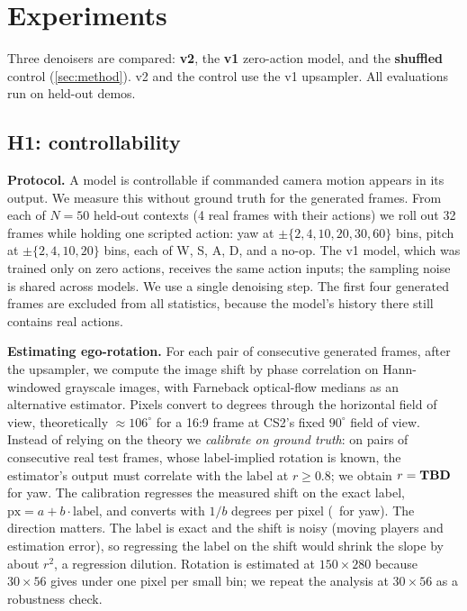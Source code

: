 \section{Experiments}
\label{sec:experiments}
Three denoisers are compared: \textbf{v2}, the \textbf{v1} zero-action model, and the \textbf{shuffled} control (\cref{sec:method}).
v2 and the control use the v1 upsampler.
All evaluations run on held-out demos.

\subsection{H1: controllability}
\label{sec:h1}
\textbf{Protocol.}
A model is controllable if commanded camera motion appears in its output.
We measure this without ground truth for the generated frames.
From each of $N=50$ held-out contexts (4 real frames with their actions) we roll out 32 frames while holding one scripted action:
yaw at $\pm\{2,4,10,20,30,60\}$ bins, pitch at $\pm\{2,4,10,20\}$ bins, each of W, S, A, D, and a no-op.
The v1 model, which was trained only on zero actions, receives the same action inputs; the sampling noise is shared across models.
We use a single denoising step.
The first four generated frames are excluded from all statistics, because the model's history there still contains real actions.

\textbf{Estimating ego-rotation.}
For each pair of consecutive generated frames, after the upsampler, we compute the image shift by phase correlation on Hann-windowed grayscale images, with Farneback optical-flow medians as an alternative estimator.
Pixels convert to degrees through the horizontal field of view, theoretically $\approx106^\circ$ for a 16:9 frame at CS2's fixed $90^\circ$ field of view.
Instead of relying on the theory we \emph{calibrate on ground truth}: on pairs of consecutive real test frames, whose label-implied rotation is known, the estimator's output must correlate with the label at $r\ge0.8$; we obtain $r=\textbf{TBD}$ for yaw.
The calibration regresses the measured shift on the exact label, $\mathrm{px}=a+b\cdot\mathrm{label}$, and converts with $1/b$ degrees per pixel (\TBDdegperpx\ for yaw).
The direction matters.
The label is exact and the shift is noisy (moving players and estimation error), so regressing the label on the shift would shrink the slope by about $r^2$, a regression dilution.
Rotation is estimated at $150{\times}280$ because $30{\times}56$ gives under one pixel per small bin; we repeat the analysis at $30{\times}56$ as a robustness check.

